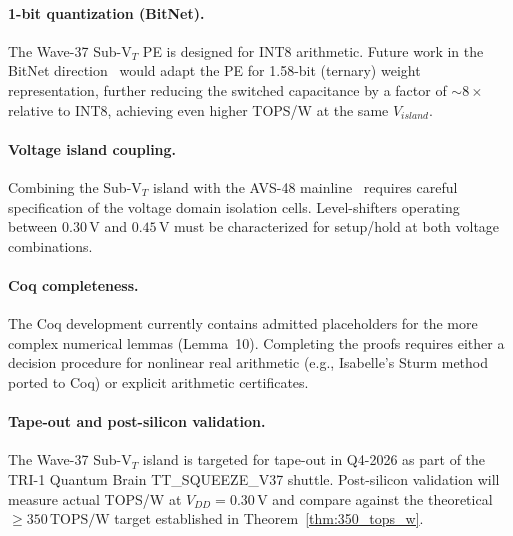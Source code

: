 \paragraph{1-bit quantization (BitNet).}
The Wave-37 Sub-V$_T$ PE is designed for INT8 arithmetic.  Future work in the BitNet
direction~\cite{bitnet158} would adapt the PE for 1.58-bit (ternary) weight representation,
further reducing the switched capacitance by a factor of $\sim 8\times$ relative to INT8,
achieving even higher TOPS/W at the same $V_{island}$.

\paragraph{Voltage island coupling.}
Combining the Sub-V$_T$ island with the AVS-48 mainline~\cite{wave36squeeze} requires
careful specification of the voltage domain isolation cells.  Level-shifters operating
between $0.30\,\text{V}$ and $0.45\,\text{V}$ must be characterized for setup/hold
at both voltage combinations.

\paragraph{Coq completeness.}
The Coq development currently contains admitted placeholders for the more complex
numerical lemmas (Lemma~10).  Completing the proofs requires either a decision procedure
for nonlinear real arithmetic (e.g., Isabelle's Sturm method ported to Coq) or
explicit arithmetic certificates.

\paragraph{Tape-out and post-silicon validation.}
The Wave-37 Sub-V$_T$ island is targeted for tape-out in Q4-2026 as part of the TRI-1
Quantum Brain TT\_SQUEEZE\_V37 shuttle.  Post-silicon validation will measure actual
TOPS/W at $V_{DD} = 0.30\,\text{V}$ and compare against the theoretical $\geq 350\,\text{TOPS/W}$
target established in Theorem~\ref{thm:350_tops_w}.

